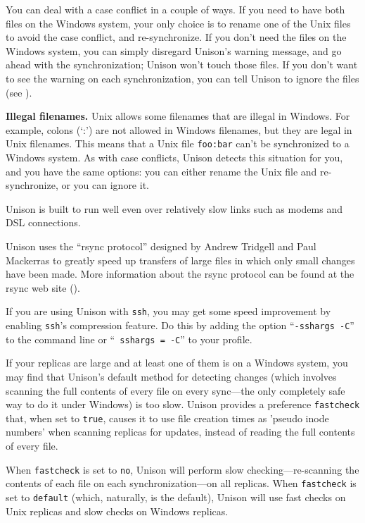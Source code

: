\documentclass{article}
\begin{document}
You can deal with a case conflict in a couple of ways.  If you need to
have both files on the Windows system, your only choice is to rename
one of the Unix files to avoid the case conflict, and re-synchronize.
If you don't need the files on the Windows system, you can simply
disregard Unison's warning message, and go ahead with the
synchronization; Unison won't touch those files.  If you don't want to
see the warning on each synchronization, you can tell Unison to ignore
the files (see ).

\textbf{Illegal filenames.}  Unix allows some filenames that are
illegal in Windows.  For example, colons (`:') are not allowed in
Windows filenames, but they are legal in Unix filenames.  This means
that a Unix file \texttt{foo:bar} can't be synchronized to a Windows
system.  As with case conflicts, Unison detects this situation for
you, and you have the same options: you can either rename the Unix
file and re-synchronize, or you can ignore it.



Unison is built to run well even over relatively slow links such as
modems and DSL connections.

Unison uses the ``rsync protocol'' designed by Andrew Tridgell and Paul
Mackerras to greatly speed up transfers of large files in which only
small changes have been made.  More information about the rsync protocol
can be found at the rsync web site ().

If you are using Unison with {\tt ssh}, you may get some speed
improvement by enabling {\tt ssh}'s compression feature.  Do this by
adding the option ``{\tt -sshargs -C}'' to the command line or ``{\tt
  sshargs = -C}'' to your profile.



If your replicas are large and at least one of them is on a Windows
system, you may find that Unison's default method for detecting changes
(which involves scanning the full contents of every file on every
sync---the only completely safe way to do it under Windows) is too slow.
Unison provides a preference {\tt fastcheck} that, when set to
\verb|true|, causes it to use file creation times as 'pseudo inode
numbers' when scanning replicas for updates, instead of reading the full
contents of every file.

When \verb|fastcheck| is set to \verb|no|,
Unison will perform slow checking---re-scanning the contents of each file
on each synchronization---on all replicas.  When \verb|fastcheck| is set
to \verb|default| (which, naturally, is the default), Unison will use
fast checks on Unix replicas and slow checks on Windows replicas.
\end{document}
